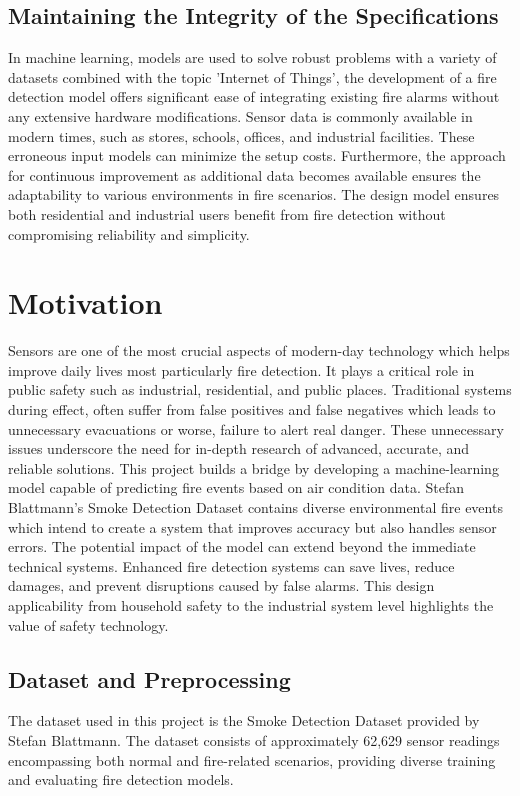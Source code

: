 \documentclass[conference]{IEEEtran}
\begin{document}
\subsection{Maintaining the Integrity of the Specifications}

In machine learning, models are used to solve robust problems with a variety of datasets combined with the topic 'Internet of Things', the development of a fire detection model offers significant ease of integrating existing fire alarms without any extensive hardware modifications. Sensor data is commonly available in modern times, such as stores, schools, offices, and industrial facilities. These erroneous input models can minimize the setup costs. Furthermore, the approach for continuous improvement as additional data becomes available ensures the adaptability to various environments in fire scenarios. The design model ensures both residential and industrial users benefit from fire detection without compromising reliability and simplicity.   

\section{Motivation}
Sensors are one of the most crucial aspects of modern-day technology which helps improve daily lives most particularly fire detection. It plays a critical role in public safety such as industrial, residential, and public places. Traditional systems during effect, often suffer from false positives and false negatives which leads to unnecessary evacuations or worse, failure to alert real danger. These unnecessary issues underscore the need for in-depth research of advanced, accurate, and reliable solutions. 
This project builds a bridge by developing a machine-learning model capable of predicting fire events based on air condition data. Stefan Blattmann's Smoke Detection Dataset contains diverse environmental fire events which intend to create a system that improves accuracy but also handles sensor errors. 
The potential impact of the model can extend beyond the immediate technical systems. Enhanced fire detection systems can save lives, reduce damages, and prevent disruptions caused by false alarms. This design applicability from household safety to the industrial system level highlights the value of safety technology. 


\subsection{Dataset and Preprocessing}\label{AA}
The dataset used in this project is the Smoke Detection Dataset provided by Stefan Blattmann. The dataset consists of approximately 62,629 sensor readings encompassing both normal and fire-related scenarios, providing diverse training and evaluating fire detection models.
\end{document}
